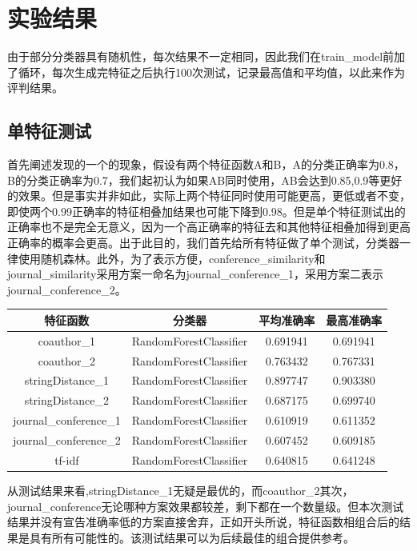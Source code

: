 \documentclass{mcmthesis}
\begin{document}
\section{实验结果}
\par 由于部分分类器具有随机性，每次结果不一定相同，因此我们在train\_model前加了循环，每次生成完特征之后执行100次测试，记录最高值和平均值，以此来作为评判结果。
\subsection{单特征测试}
\par 首先阐述发现的一个的现象，假设有两个特征函数A和B，A的分类正确率为0.8，B的分类正确率为0.7，我们起初认为如果AB同时使用，AB会达到0.85,0.9等更好的效果。但是事实并非如此，实际上两个特征同时使用可能更高，更低或者不变，即使两个0.99正确率的特征相叠加结果也可能下降到0.98。但是单个特征测试出的正确率也不是完全无意义，因为一个高正确率的特征去和其他特征相叠加得到更高正确率的概率会更高。出于此目的，我们首先给所有特征做了单个测试，分类器一律使用随机森林。此外，为了表示方便，conference\_similarity和journal\_similarity采用方案一命名为journal\_conference\_1，采用方案二表示journal\_conference\_2。
\begin{center}
	\begin{tabular}{cccc}
		\hline
		特征函数 & 分类器 &  平均准确率 & 最高准确率 \\
		\hline
		coauthor\_1 & RandomForestClassifier & 0.691941 & 0.691941 \\
		coauthor\_2 & RandomForestClassifier & 0.763432 & 0.767331  \\
		stringDistance\_1 & RandomForestClassifier & 0.897747 & 0.903380 \\
		stringDistance\_2 & RandomForestClassifier & 0.687175 & 0.699740  \\
		journal\_conference\_1 & RandomForestClassifier & 0.610919 & 0.611352 \\
		journal\_conference\_2 & RandomForestClassifier & 0.607452 & 0.609185 \\
		tf-idf & RandomForestClassifier & 0.640815 & 0.641248\\
		\hline
	\end{tabular}
\end{center}
	\par 从测试结果来看,stringDistance\_1无疑是最优的，而coauthor\_2其次，journal\_conference无论哪种方案效果都较差，剩下都在一个数量级。但本次测试结果并没有宣告准确率低的方案直接舍弃，正如开头所说，特征函数相组合后的结果是具有所有可能性的。该测试结果可以为后续最佳的组合提供参考。
\end{document}
